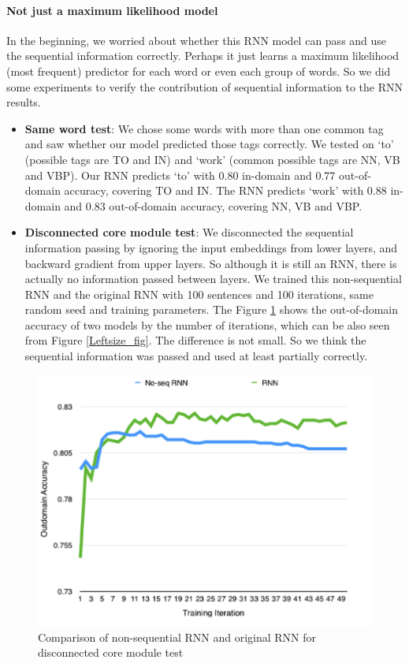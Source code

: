 \documentclass[11pt]{article}
\begin{document}
\paragraph{Not just a maximum likelihood model}
In the beginning, we worried about whether this RNN model can pass and use the sequential information correctly. Perhaps it just learns a maximum likelihood (most frequent) predictor for each word or even each group of words. So we did some experiments to verify the contribution of sequential information to the RNN results.

\begin{itemize}
\item \textbf{Same word test}:  We chose some words with more than one common tag and saw whether our model predicted those tags correctly. We tested on `to' (possible tags are TO and IN) and `work' (common possible tags are NN, VB and VBP). Our RNN predicts `to' with 0.80 in-domain and 0.77 out-of-domain accuracy, covering TO and IN. The RNN predicts `work' with 0.88 in-domain and 0.83 out-of-domain accuracy, covering NN, VB and VBP.
\item \textbf{Disconnected core module test}: We disconnected the sequential information passing by ignoring the input embeddings from lower layers, and backward gradient from upper layers. So although it is still an RNN, there is actually no information passed between layers. We trained this non-sequential RNN and the original RNN with 100 sentences and 100 iterations, same random seed and training parameters. The Figure \ref{Noseq_fig} shows the out-of-domain accuracy of two models by the number of iterations, which can be also seen from Figure \ref{Leftsize_fig}. The difference is not small. So we think the sequential information was passed and used at least partially correctly.
\end{itemize}
\begin{figure}
\includegraphics[scale=0.5]{outdomain_noseq.png}
\caption{Comparison of non-sequential RNN and original RNN for disconnected core module test}\label{Noseq_fig}
\end{figure}
\end{document}
